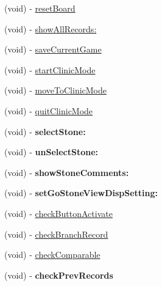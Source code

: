 \begin{DoxyCompactItemize}
\item 
(void) -\/ \hyperlink{interface_abstract_record_view_controller_af3b65256360492aa93ae7ac9f30b76f1}{resetBoard}
\item 
(void) -\/ \hyperlink{interface_abstract_record_view_controller_a056d70c4b20510d4e7a01afe8969085a}{showAllRecords:}
\item 
(void) -\/ \hyperlink{interface_abstract_record_view_controller_a6ac797433b51ead28bcad34f1ca007b3}{saveCurrentGame}
\item 
(void) -\/ \hyperlink{interface_abstract_record_view_controller_a88c06199d7984204877247efa0fd7d74}{startClinicMode}
\item 
(void) -\/ \hyperlink{interface_abstract_record_view_controller_a168fde1ca4265b914184586db6879a0c}{moveToClinicMode}
\item 
(void) -\/ \hyperlink{interface_abstract_record_view_controller_a4654420f24fa6731e6dc5fa0fb4cf2a9}{quitClinicMode}
\item 
\hypertarget{interface_abstract_record_view_controller_a2486a78d1ba9dafa3420bc04c4d01777}{
(void) -\/ {\bfseries selectStone:}}
\label{interface_abstract_record_view_controller_a2486a78d1ba9dafa3420bc04c4d01777}

\item 
\hypertarget{interface_abstract_record_view_controller_a15573660efc14f63a120755ca61fc28e}{
(void) -\/ {\bfseries unSelectStone:}}
\label{interface_abstract_record_view_controller_a15573660efc14f63a120755ca61fc28e}

\item 
\hypertarget{interface_abstract_record_view_controller_ad02361418e5b86ddbf7946b920b20934}{
(void) -\/ {\bfseries showStoneComments:}}
\label{interface_abstract_record_view_controller_ad02361418e5b86ddbf7946b920b20934}

\item 
\hypertarget{interface_abstract_record_view_controller_a2d7a681d978dd332edcbe7ee9a01e0a0}{
(void) -\/ {\bfseries setGoStoneViewDispSetting:}}
\label{interface_abstract_record_view_controller_a2d7a681d978dd332edcbe7ee9a01e0a0}

\item 
(void) -\/ \hyperlink{interface_abstract_record_view_controller_a778850dccbf812d31aa9c0af085524b8}{checkButtonActivate}
\item 
(void) -\/ \hyperlink{interface_abstract_record_view_controller_aa9e3322b6d0237359c2bb22952aab672}{checkBranchRecord}
\item 
(void) -\/ \hyperlink{interface_abstract_record_view_controller_a0bfed8687161c14e782505a08de09ef5}{checkComparable}
\item 
\hypertarget{interface_abstract_record_view_controller_a97400ed3e78f1e33b83e32d0faaaae54}{
(void) -\/ {\bfseries checkPrevRecords}}
\label{interface_abstract_record_view_controller_a97400ed3e78f1e33b83e32d0faaaae54}


\end{DoxyCompactItemize}
